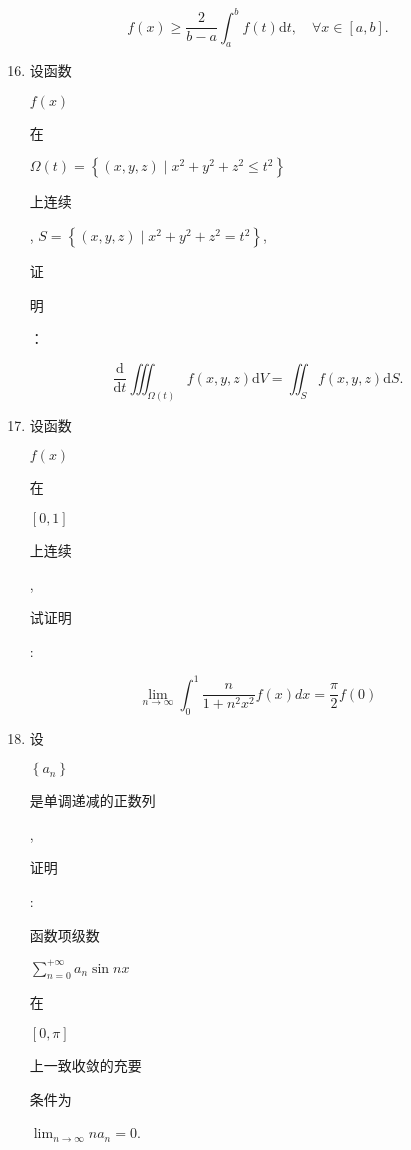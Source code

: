 \documentclass[10pt]{article}
\begin{document}
$$
f(x) \geqslant \frac{2}{b-a} \int_{a}^{b} f(t) \mathrm{d} t, \quad \forall x \in[a, b] .
$$

\begin{enumerate}
  \setcounter{enumi}{15}
  \item \begin{CJK}{UTF8}{mj}设函数\end{CJK} $f(x)$ \begin{CJK}{UTF8}{mj}在\end{CJK} $\Omega(t)=\left\{(x, y, z) \mid x^{2}+y^{2}+z^{2} \leqslant t^{2}\right\}$ \begin{CJK}{UTF8}{mj}上连续\end{CJK}, $S=\left\{(x, y, z) \mid x^{2}+y^{2}+z^{2}=t^{2}\right\}$, \begin{CJK}{UTF8}{mj}证\end{CJK} \begin{CJK}{UTF8}{mj}明\end{CJK}：
\end{enumerate}
$$
\frac{\mathrm{d}}{\mathrm{d} t} \iiint_{\Omega(t)} f(x, y, z) \mathrm{d} V=\iint_{S} f(x, y, z) \mathrm{d} S .
$$

\begin{enumerate}
  \setcounter{enumi}{16}
  \item \begin{CJK}{UTF8}{mj}设函数\end{CJK} $f(x)$ \begin{CJK}{UTF8}{mj}在\end{CJK} $[0,1]$ \begin{CJK}{UTF8}{mj}上连续\end{CJK}, \begin{CJK}{UTF8}{mj}试证明\end{CJK}:
\end{enumerate}
$$
\lim _{n \rightarrow \infty} \int_{0}^{1} \frac{n}{1+n^{2} x^{2}} f(x) d x=\frac{\pi}{2} f(0)
$$

\begin{enumerate}
  \setcounter{enumi}{17}
  \item \begin{CJK}{UTF8}{mj}设\end{CJK} $\left\{a_{n}\right\}$ \begin{CJK}{UTF8}{mj}是单调递减的正数列\end{CJK}, \begin{CJK}{UTF8}{mj}证明\end{CJK}: \begin{CJK}{UTF8}{mj}函数项级数\end{CJK} $\sum_{n=0}^{+\infty} a_{n} \sin n x$ \begin{CJK}{UTF8}{mj}在\end{CJK} $[0, \pi]$ \begin{CJK}{UTF8}{mj}上一致收敛的充要\end{CJK} \begin{CJK}{UTF8}{mj}条件为\end{CJK} $\lim _{n \rightarrow \infty} n a_{n}=0$.
\end{enumerate}
\end{document}
